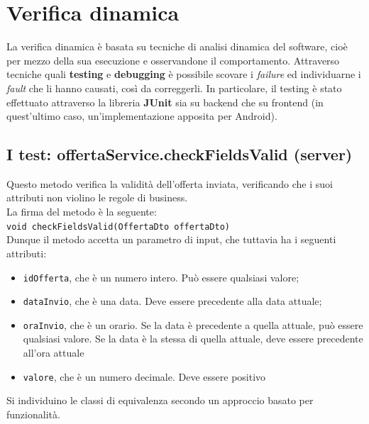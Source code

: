     \section{Verifica dinamica}
        La verifica dinamica è basata su tecniche di analisi dinamica del software, cioè per mezzo della sua esecuzione e osservandone il comportamento. Attraverso tecniche quali \textbf{testing} e \textbf{debugging} è possibile scovare i \textit{failure} ed individuarne i \textit{fault} che li hanno causati, così da correggerli. In particolare, il testing è stato effettuato attraverso la libreria \textbf{JUnit} sia su backend che su frontend (in quest'ultimo caso, un'implementazione apposita per Android).
        
        \subsection{I test: offertaService.checkFieldsValid (server)}
            Questo metodo verifica la validità dell'offerta inviata, verificando che i suoi attributi non violino le regole di business. \\
            
            \noindent La firma del metodo è la seguente:\\
            \texttt{void checkFieldsValid(OffertaDto offertaDto)} \\
            
            \noindent Dunque il metodo accetta un parametro di input, che tuttavia ha i seguenti attributi:
            \begin{itemize}
                \item \texttt{idOfferta}, che è un numero intero. Può essere qualsiasi valore;
                \item \texttt{dataInvio}, che è una data. Deve essere precedente alla data attuale;
                \item \texttt{oraInvio}, che è un orario. Se la data è precedente a quella attuale, può essere qualsiasi valore. Se la data è la stessa di quella attuale, deve essere precedente all'ora attuale
                \item \texttt{valore}, che è un numero decimale. Deve essere positivo \\
            \end{itemize}
            
            \noindent Si individuino le classi di equivalenza secondo un approccio basato per funzionalità.

